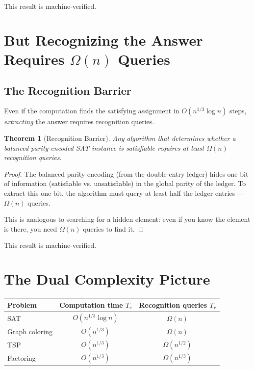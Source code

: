 \documentclass[12pt,a4paper]{article}
\newtheorem{theorem}{Theorem}[section]
\theoremstyle{definition}
\theoremstyle{remark}
\begin{document}
This result is machine-verified.

\section{But Recognizing the Answer Requires $\Omega(n)$ Queries}

\subsection{The Recognition Barrier}

Even if the computation finds the satisfying assignment in $O(n^{1/3} \log n)$ 
steps, \emph{extracting} the answer requires recognition queries.

\begin{theorem}[Recognition Barrier]
Any algorithm that determines whether a balanced parity-encoded 
SAT instance is satisfiable requires at least $\Omega(n)$ recognition queries.
\end{theorem}

\begin{proof}
The balanced parity encoding (from the double-entry ledger) 
hides one bit of information (satisfiable vs. unsatisfiable) in the global 
parity of the ledger. To extract this one bit, the algorithm must query at 
least half the ledger entries --- $\Omega(n)$ queries.

This is analogous to searching for a hidden element: even if you know the element 
is there, you need $\Omega(n)$ queries to find it.
\end{proof}

This result is machine-verified.

\section{The Dual Complexity Picture}

\begin{center}
\begin{tabular}{lcc}
\hline
\textbf{Problem} & \textbf{Computation time $T_c$} & \textbf{Recognition queries $T_r$} \\
\hline
SAT & $O(n^{1/3} \log n)$ & $\Omega(n)$ \\
Graph coloring & $O(n^{1/3})$ & $\Omega(n)$ \\
TSP & $O(n^{1/3})$ & $\Omega(n^{1/2})$ \\
Factoring & $O(n^{1/3})$ & $\Omega(n^{1/3})$ \\
\hline
\end{tabular}
\end{center}
\end{document}
